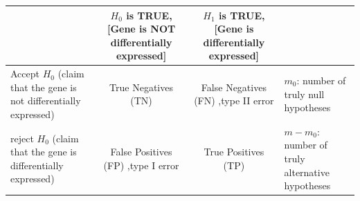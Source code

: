 \documentclass[12pt,]{krantz}
\theoremstyle{definition}
\theoremstyle{definition}
\theoremstyle{definition}
\theoremstyle{remark}
\begin{document}
\begin{longtable}[]{@{}lccl@{}}
\toprule
\begin{minipage}[b]{0.17\columnwidth}\raggedright
\strut
\end{minipage} & \begin{minipage}[b]{0.22\columnwidth}\centering
\(H_0\) is TRUE, {[}Gene is NOT differentially expressed{]}\strut
\end{minipage} & \begin{minipage}[b]{0.22\columnwidth}\centering
\(H_1\) is TRUE, {[}Gene is differentially expressed{]}\strut
\end{minipage} & \begin{minipage}[b]{0.27\columnwidth}\raggedright
\strut
\end{minipage}\tabularnewline
\midrule
\endhead
\begin{minipage}[t]{0.17\columnwidth}\raggedright
Accept \(H_0\) (claim that the gene is not differentially
expressed)\strut
\end{minipage} & \begin{minipage}[t]{0.22\columnwidth}\centering
True Negatives (TN)\strut
\end{minipage} & \begin{minipage}[t]{0.22\columnwidth}\centering
False Negatives (FN) ,type II error\strut
\end{minipage} & \begin{minipage}[t]{0.27\columnwidth}\raggedright
\(m_0\): number of truly null hypotheses\strut
\end{minipage}\tabularnewline
\begin{minipage}[t]{0.17\columnwidth}\raggedright
reject \(H_0\) (claim that the gene is differentially expressed)\strut
\end{minipage} & \begin{minipage}[t]{0.22\columnwidth}\centering
False Positives (FP) ,type I error\strut
\end{minipage} & \begin{minipage}[t]{0.22\columnwidth}\centering
True Positives (TP)\strut
\end{minipage} & \begin{minipage}[t]{0.27\columnwidth}\raggedright
\(m-m_0\): number of truly alternative hypotheses\strut
\end{minipage}\tabularnewline
\bottomrule
\end{longtable}
\end{document}

